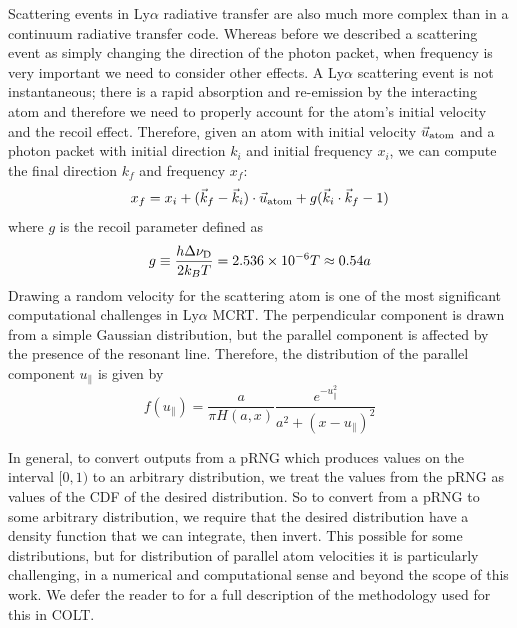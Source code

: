 Scattering events in Ly$\alpha$ radiative transfer are also much more complex than in a continuum radiative transfer code.
Whereas before we described a scattering event as simply changing the direction of the photon packet, when frequency is very important we need to consider other effects.
A Ly$\alpha$ scattering event is not instantaneous; there is a rapid absorption and re-emission by the interacting atom and therefore we need to properly account for the atom's initial velocity and the recoil effect.
Therefore, given an atom with initial velocity $\vec{u}_{\rm{atom}}$ and a photon packet with initial direction $k_{i}$ and initial frequency $x_{i}$, we can compute the final direction $k_{f}$ and frequency $x_{f}$:
\begin{equation}
    x_{f} = x_{i} + (\vec{k}_{f} - \vec{k}_{i})\cdot \vec{u}_{\rm{atom}} + g(\vec{k}_{i}\cdot\vec{k}_{f} - 1)
\end{equation}
where $g$ is the recoil parameter defined as
\begin{equation}
    g \equiv \frac{h\Delta\nu_{\rm{D}}}{2k_{B}T} = 2.536 \times 10^{-6}T \approx 0.54 a
\end{equation}
Drawing a random velocity for the scattering atom is one of the most significant computational challenges in Ly$\alpha$ MCRT.
The perpendicular component is drawn from a simple Gaussian distribution, but the parallel component is affected by the presence of the resonant line.
Therefore, the distribution of the parallel component $u_{\parallel}$ is given by
\begin{equation}
    f(u_{\parallel}) = \frac{a}{\pi H(a, x)}\frac{e^{-u_{\parallel}^{2}}}{a^{2} + (x - u_{\parallel})^{2}}
\end{equation}

In general, to convert outputs from a pRNG which produces values on the interval $[0, 1)$ to an arbitrary distribution, we treat the values from the pRNG as values of the CDF of the desired distribution.
So to convert from a pRNG to some arbitrary distribution, we require that the desired distribution have a density function that we can integrate, then invert.
This possible for some distributions, but for distribution of parallel atom velocities it is particularly challenging, in a numerical and computational sense and beyond the scope of this work.
We defer the reader to \citep{Smith2015} for a full description of the methodology used for this in \textsc{COLT}.

